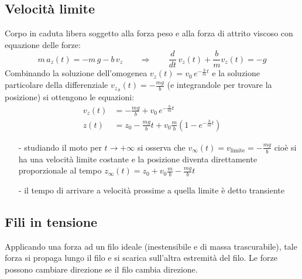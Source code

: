 \documentclass[a4paper]{article}
\newcommand\dt{\frac{d}{dt}\,}
\begin{document}
\newpage

\subsection{Velocità limite}
Corpo in caduta libera soggetto alla forza peso e alla forza di attrito viscoso con equazione delle forze:
\[m \, a_z(t) = -m \, g -b \, v_z \qquad \Rightarrow \qquad \dt v_z(t) + \frac{b}{m} v_z(t) = -g\]
Combinando la soluzione dell'omogenea \(\displaystyle v_z(t) = v_0 \, e^{- \frac{b}{m} t}\) e la soluzione particolare della
differenziale \(\displaystyle {v_z}_s(t) = -\frac{m g}{b}\) (e integrandole per trovare la posizione) si ottengono le equazioni:
\begin{align*}
	v_z(t) &= -\frac{mg}{b} + v_0 \, e^{-\frac{b}{m}t} \\
	z(t) &= z_0 -\frac{mg}{b}t + v_0 \frac{m}{b} \left(1-e^{-\frac{b}{m}t}\right)
\end{align*}
\begin{itemize}[topsep=3pt, itemsep=0pt]
	\item[-] studiando il moto per \(t \to +\infty\) si osserva che \(\displaystyle v_\infty(t) = v_\text{limite} = -\frac{mg}{b}\)
	cioè si ha una velocità limite costante e la posizione diventa direttamente proporzionale al tempo \(\displaystyle z_\infty(t) = z_0 + v_0 \frac{m}{b} - \frac{mg}{b} t\)
	\item[-] il tempo di arrivare a velocità prossime a quella limite è detto transiente
\end{itemize}

\subsection{Fili in tensione}
Applicando una forza ad un filo ideale (inestensibile e di massa trascurabile), tale forza si propaga lungo il filo e si scarica
sull'altra estremità del filo. Le forze possono cambiare direzione se il filo cambia direzione.
\end{document}
